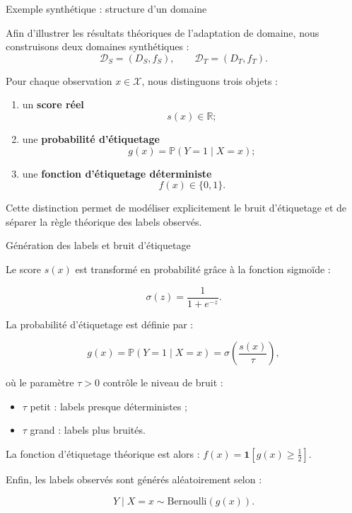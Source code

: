 \documentclass[11pt]{beamer}
\begin{document}
\begin{frame}{Exemple synthétique : structure d’un domaine}

Afin d’illustrer les résultats théoriques de l’adaptation de domaine, nous construisons deux domaines synthétiques :
\[
\mathcal D_S=(D_S,f_S), \qquad \mathcal D_T=(D_T,f_T).
\]

Pour chaque observation \(x\in\mathcal X\), nous distinguons trois objets :

\begin{enumerate}
    \item un \textbf{score réel}
    \[
    s(x)\in\mathbb R;
    \]

    \item une \textbf{probabilité d’étiquetage}
    \[
    g(x)=\mathbb P(Y=1\mid X=x);
    \]

    \item une \textbf{fonction d’étiquetage déterministe}
    \[
    f(x)\in\{0,1\}.
    \]
\end{enumerate}

\vspace{0.2cm}

Cette distinction permet de modéliser explicitement le bruit d’étiquetage et de séparer la règle théorique des labels observés.

\end{frame}


\begin{frame}{Génération des labels et bruit d’étiquetage}

Le score \(s(x)\) est transformé en probabilité grâce à la fonction sigmoïde :

\[
\sigma(z)=\frac{1}{1+e^{-z}}.
\]

La probabilité d’étiquetage est définie par :

\[
g(x)=\mathbb P(Y=1\mid X=x)
=\sigma\!\left(\frac{s(x)}{\tau}\right),
\]

où le paramètre \(\tau>0\) contrôle le niveau de bruit :

\begin{itemize}
    \item \(\tau\) petit : labels presque déterministes ;
    \item \(\tau\) grand : labels plus bruités.
\end{itemize}

La fonction d’étiquetage théorique est alors : $
f(x)=\mathbf 1\!\left[g(x)\ge \frac12\right].$

Enfin, les labels observés sont générés aléatoirement selon :

\[
Y \mid X=x \sim \mathrm{Bernoulli}(g(x)).
\]

\end{frame}
\end{document}
